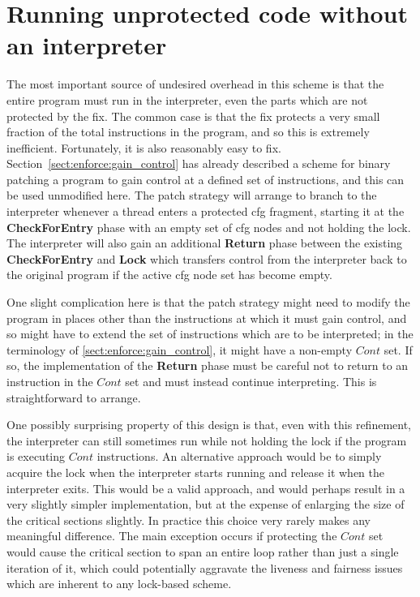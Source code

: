 \section{Running unprotected code without an interpreter}

The most important source of undesired overhead in this scheme is that
the entire program must run in the interpreter, even the parts which
are not protected by the fix.  The common case is that the fix
protects a very small fraction of the total instructions in the
program, and so this is extremely inefficient.  Fortunately, it is
also reasonably easy to fix.  Section~\ref{sect:enforce:gain_control}
has already described a scheme for binary patching a program to gain
control at a defined set of instructions, and this can be used
unmodified here.  The patch strategy will arrange to branch to the
interpreter whenever a thread enters a protected \gls{cfg} fragment,
starting it at the \textbf{CheckForEntry} phase with an empty set of
\gls{cfg} nodes and not holding the lock.  The interpreter will also gain an
additional \textbf{Return} phase between the existing
\textbf{CheckForEntry} and \textbf{Lock} which transfers control from
the interpreter back to the original program if the active \gls{cfg} node
set has become empty.

One slight complication here is that the patch strategy might need to
modify the program in places other than the instructions at which it
must gain control, and so might have to extend the set of instructions
which are to be interpreted; in the terminology of
\autoref{sect:enforce:gain_control}, it might have a non-empty
$\mathit{Cont}$ set.  If so, the implementation of the \textbf{Return}
phase must be careful not to return to an instruction in the
$\mathit{Cont}$ set and must instead continue interpreting.  This is
straightforward to arrange.

One possibly surprising property of this design is that, even with
this refinement, the interpreter can still sometimes run while not
holding the lock if the program is executing $\mathit{Cont}$
instructions.  An alternative approach would be to simply acquire the
lock when the interpreter starts running and release it when the
interpreter exits.  This would be a valid approach, and would perhaps
result in a very slightly simpler implementation, but at the expense
of enlarging the size of the critical sections slightly.  In practice
this choice very rarely makes any meaningful difference.  The main
exception occurs if protecting the $\mathit{Cont}$ set would cause the
critical section to span an entire loop rather than just a single
iteration of it, which could potentially aggravate the liveness and
fairness issues which are inherent to any lock-based scheme.

